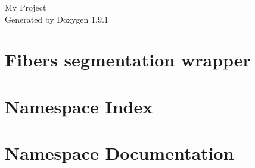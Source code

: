 \let\mypdfximage\pdfximage\def\pdfximage{\immediate\mypdfximage}\documentclass[twoside]{book}
\newcommand{\+}{\discretionary{\mbox{\scriptsize$\hookleftarrow$}}{}{}}
\newcommand{\clearemptydoublepage}{%
  \newpage{\pagestyle{empty}\cleardoublepage}%
}
\begin{document}
\raggedbottom

\hypersetup{pageanchor=false,
             bookmarksnumbered=true,
             pdfencoding=unicode
            }
\begin{titlepage}
\vspace*{7cm}
\begin{center}%
{\Large My Project }\\
\vspace*{1cm}
{\large Generated by Doxygen 1.9.1}\\
\end{center}
\end{titlepage}
\clearemptydoublepage
{}
\tableofcontents
\clearemptydoublepage
{}
\hypersetup{pageanchor=true}

\chapter{Fibers segmentation wrapper}
\label{index}\hypertarget{index}{}
\chapter{Namespace Index}

\chapter{Namespace Documentation}




\backmatter
\newpage
{}
\clearemptydoublepage
{}
\printindex
\end{document}
